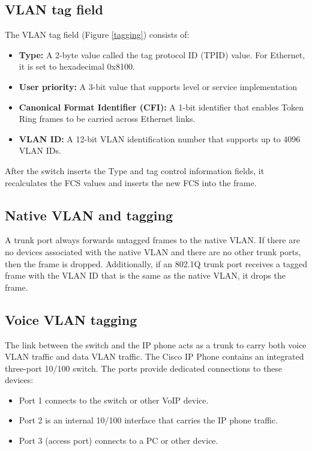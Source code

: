 \subsection{VLAN tag field}

The VLAN tag field (Figure \ref{tagging}) consists of: 

\begin{itemize}
\item \textbf{Type:} A 2-byte value called the tag protocol ID (TPID) value. For Ethernet, it is set to hexadecimal 0x8100.

\item \textbf{User priority:} A 3-bit value that supports level or service implementation

\item \textbf{Canonical Format Identifier (CFI):} A 1-bit identifier that enables Token Ring frames to be carried across Ethernet links.

\item \textbf{VLAN ID:} A 12-bit VLAN identification number that supports up to 4096 VLAN IDs.
\end{itemize}

After the switch inserts the Type and tag control information fields, it recalculates the FCS values and inserts the new FCS into the frame.

\subsection{Native VLAN and tagging}

A trunk port always forwards untagged frames to the native VLAN. If there are no devices associated with the native VLAN and there are no other trunk ports, then the frame is dropped. Additionally, if an 802.1Q trunk port receives a tagged frame with the VLAN ID that is the same as the native VLAN, it drops the frame.

\subsection{Voice VLAN tagging}

The link between the switch and the IP phone acts as a trunk to carry both voice VLAN traffic and data VLAN traffic. The Cisco IP Phone contains an integrated three-port 10/100 switch. The ports provide dedicated connections to these devices:

\begin{itemize}
\item Port 1 connects to the switch or other VoIP device.
\item Port 2 is an internal 10/100 interface that carries the IP phone traffic.
\item Port 3 (access port) connects to a PC or other device.
\end{itemize}

